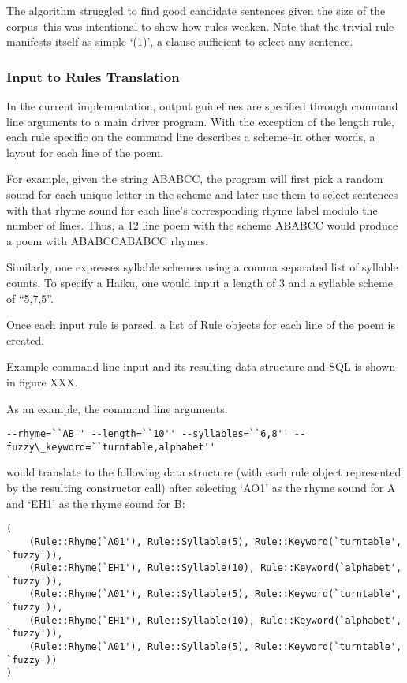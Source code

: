 \documentclass[10pt]{article}
\begin{document}
The algorithm struggled to find good candidate sentences given the size of the
corpus--this was intentional to show how rules weaken. Note that the trivial
rule manifests itself as simple `(1)', a clause sufficient to select any
sentence.

\subsubsection{Input to Rules Translation}
In the current implementation, output guidelines are specified through command
line arguments to a main driver program. With the exception of the length rule,
each rule specific on the command line describes a scheme--in other words, a
layout for each line of the poem.

For example, given the string ABABCC, the program will first pick a random
sound for each unique letter in the scheme and later use them to select
sentences with that rhyme sound for each line's corresponding rhyme label
modulo the number of lines. Thus, a 12 line poem with the scheme ABABCC would
produce a poem with ABABCCABABCC rhymes.

Similarly, one expresses syllable schemes using a comma separated list of
syllable counts. To specify a Haiku, one would input a length of 3 and a
syllable scheme of ``5,7,5''.

Once each input rule is parsed, a list of Rule objects for each line of the
poem is created. 

Example command-line input and its resulting data structure and SQL is shown in
figure XXX.

As an example, the command line arguments:
\begin{verbatim}
--rhyme=``AB'' --length=``10'' --syllables=``6,8'' --fuzzy\_keyword=``turntable,alphabet''
\end{verbatim}
would translate to the following data structure (with each rule object
represented by the resulting constructor call) after selecting `AO1' as the
rhyme sound for A and `EH1' as the rhyme sound for B:

\begin{verbatim}
(
    (Rule::Rhyme(`A01'), Rule::Syllable(5), Rule::Keyword(`turntable', `fuzzy')),
    (Rule::Rhyme(`EH1'), Rule::Syllable(10), Rule::Keyword(`alphabet', `fuzzy')),
    (Rule::Rhyme(`A01'), Rule::Syllable(5), Rule::Keyword(`turntable', `fuzzy')),
    (Rule::Rhyme(`EH1'), Rule::Syllable(10), Rule::Keyword(`alphabet', `fuzzy')),
    (Rule::Rhyme(`A01'), Rule::Syllable(5), Rule::Keyword(`turntable', `fuzzy'))
)
\end{verbatim}
\end{document}
